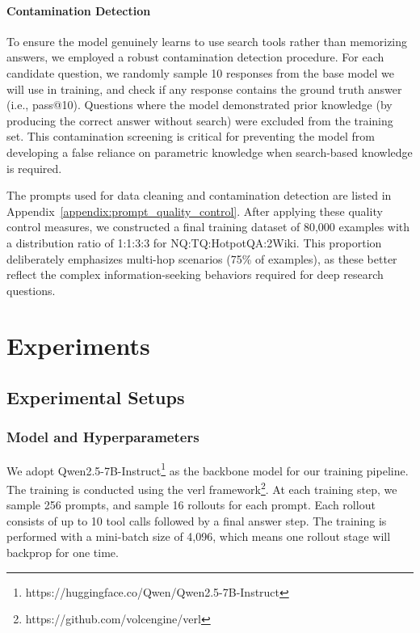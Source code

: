 \documentclass{article}
\begin{document}
\paragraph{Contamination Detection} To ensure the model genuinely learns to use search tools rather than memorizing answers, we employed a robust contamination detection procedure. For each candidate question, we randomly sample 10 responses from the base model we will use in training, and check if any response contains the ground truth answer (i.e., pass@10). Questions where the model demonstrated prior knowledge (by producing the correct answer without search) were excluded from the training set. This contamination screening is critical for preventing the model from developing a false reliance on parametric knowledge when search-based knowledge is required.

The prompts used for data cleaning and contamination detection are listed in Appendix~\ref{appendix:prompt_quality_control}. After applying these quality control measures, we constructed a final training dataset of 80,000 examples with a distribution ratio of 1:1:3:3 for NQ:TQ:HotpotQA:2Wiki. This proportion deliberately emphasizes multi-hop scenarios (75\% of examples), as these better reflect the complex information-seeking behaviors required for deep research questions.

\section{Experiments}

\subsection{Experimental Setups}

\subsubsection{Model and Hyperparameters}

We adopt Qwen2.5-7B-Instruct\footnote{https://huggingface.co/Qwen/Qwen2.5-7B-Instruct} \cite{qwen2025qwen25technicalreport} as the backbone model for our training pipeline. The training is conducted using the verl framework\footnote{https://github.com/volcengine/verl}. At each training step, we sample 256 prompts, and sample 16 rollouts for each prompt. Each rollout consists of up to 10 tool calls followed by a final answer step. The training is performed with a mini-batch size of 4,096, which means one rollout stage will backprop for one time.
\end{document}
